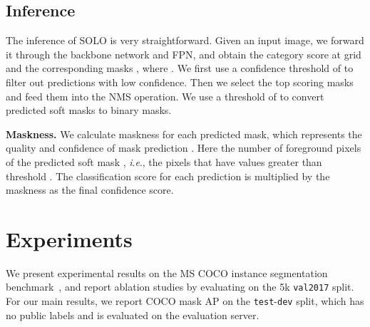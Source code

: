 \documentclass[runningheads]{llncs}
\def\method{{SOLO}\xspace}
\newcommand{\myparagraph}[1]{{ \noindent \bf #1}}
\newcommand{\ie}{\textit{i}.\textit{e}.}
\begin{document}
\subsection{Inference}

The inference of \method is very straightforward. Given an input image, we forward it through the backbone network and FPN, and obtain the category score  at grid  and the corresponding masks , where .
We first use a confidence threshold of  to filter out predictions with low confidence. Then we select the top  scoring masks and feed them into the NMS operation. We
use a threshold of  to convert predicted soft masks to binary masks. 

\myparagraph{Maskness.} We calculate maskness for each predicted mask, which represents the quality and confidence of mask prediction .
Here  the number of foreground pixels of the predicted soft mask , \ie, the pixels that have values greater than threshold .
The classification score for each prediction is multiplied by the maskness as the final confidence score.



\section{Experiments}


We present experimental results on the MS COCO instance segmentation benchmark~\cite{coco}, and report ablation studies by evaluating on the 5k \texttt{val2017} split. For our main results, we report COCO mask AP on the
\texttt{test}-\texttt{dev} split, which has no public labels and is evaluated on the evaluation server.
\end{document}

